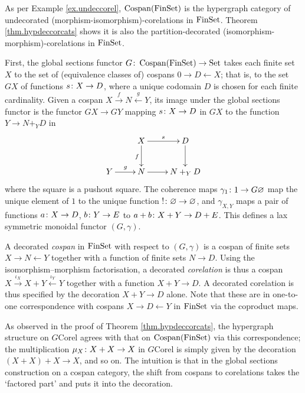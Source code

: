 \begin{example}
  As per Example \ref{ex.undeccorel}, $\operatorname{{Cospan}}(\mathrm{FinSet})$ is the hypergraph
  category of undecorated (morphism-isomorphism)-corelations in $\mathrm{FinSet}$.
  Theorem \ref{thm.hypdeccorcats} shows it is also the partition-decorated
  (isomorphism-morphism)-corelations in $\mathrm{FinSet}$.   
  
  First, the global sections functor $G{\colon} \operatorname{{Cospan}}(\mathrm{FinSet}) \to \mathrm{Set}$ takes
  each finite set $X$ to the set of (equivalence classes of) cospans $0 \to D
  \leftarrow X$; that is, to the set $GX$ of functions $s{\colon} X \to D$, where a
  unique codomain $D$ is chosen for each finite cardinality. Given a cospan $X
  \stackrel{f}\to N \stackrel{g}\leftarrow Y$, its image under the global
  sections functor is the functor $GX \to GY$ mapping $s{\colon} X \to D$ in $GX$
  to the function $Y \to N+_YD$ in
  \[
    \xymatrix{
      & X \ar[r]^s \ar[d]_f & D \ar[d] \\
      Y \ar[r]^g  & N \ar[r] & N+_YD
    }
  \]
  where the square is a pushout square. The coherence maps $\gamma_1{\colon} 1 \to
  G\varnothing$ map the unique element of $1$ to the unique function $!{\colon}
  \varnothing \to \varnothing$, and $\gamma_{X,Y}$ maps a pair of functions
  $a{\colon} X \to D$, $b{\colon} Y \to E$ to $a+b{\colon} X+Y \to D+E$. This defines a
  lax symmetric monoidal functor $(G,\gamma)$.

  A decorated \emph{cospan} in $\mathrm{FinSet}$ with respect to $(G,\gamma)$ is a cospan of
  finite sets $X \to N \leftarrow Y$ together with a function of finite sets $N
  \to D$. Using the isomorphism--morphism factorisation, a decorated
  \emph{corelation} is thus a cospan $X \xrightarrow{\iota_X} X+Y
  \xleftarrow{\iota_Y} Y$ together with a function $X+Y \to D$. A decorated
  corelation is thus specified by the decoration $X+Y \to D$ alone. Note that
  these are in one-to-one correspondence with cospans $X \to D \leftarrow Y$ in
  $\mathrm{FinSet}$ via the coproduct maps.

  As observed in the proof of Theorem \ref{thm.hypdeccorcats}, the hypergraph
  structure on $G\mathrm{Corel}$ agrees with that on $\operatorname{{Cospan}}(\mathrm{FinSet})$ via
  this correspondence; the multiplication $\mu_X{\colon} X+X \to X$ in
  $G\mathrm{Corel}$ is simply given by the decoration $(X+X)+X \to X$, and so
  on. The intuition is that in the global sections construction on a cospan
  category, the shift from cospans to corelations takes the `factored part'
  and puts it into the decoration. 


\end{example}
